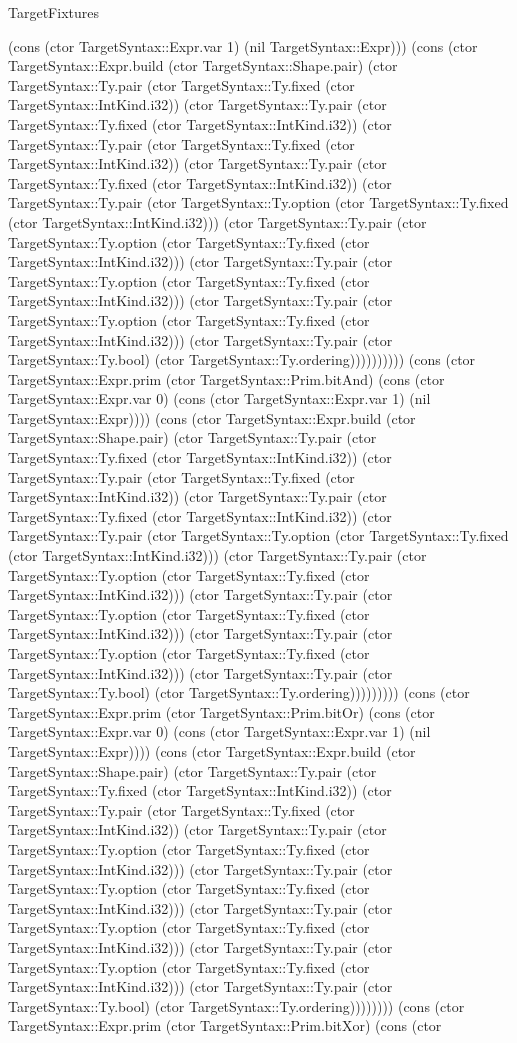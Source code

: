 \begin{lexlean}{TargetFixtures}
\begin{semanticmodule}
{(cons (ctor TargetSyntax::Expr.var 1) (nil TargetSyntax::Expr))) (cons (ctor TargetSyntax::Expr.build (ctor TargetSyntax::Shape.pair) (ctor TargetSyntax::Ty.pair (ctor TargetSyntax::Ty.fixed (ctor TargetSyntax::IntKind.i32)) (ctor TargetSyntax::Ty.pair (ctor TargetSyntax::Ty.fixed (ctor TargetSyntax::IntKind.i32)) (ctor TargetSyntax::Ty.pair (ctor TargetSyntax::Ty.fixed (ctor TargetSyntax::IntKind.i32)) (ctor TargetSyntax::Ty.pair (ctor TargetSyntax::Ty.fixed (ctor TargetSyntax::IntKind.i32)) (ctor TargetSyntax::Ty.pair (ctor TargetSyntax::Ty.option (ctor TargetSyntax::Ty.fixed (ctor TargetSyntax::IntKind.i32))) (ctor TargetSyntax::Ty.pair (ctor TargetSyntax::Ty.option (ctor TargetSyntax::Ty.fixed (ctor TargetSyntax::IntKind.i32))) (ctor TargetSyntax::Ty.pair (ctor TargetSyntax::Ty.option (ctor TargetSyntax::Ty.fixed (ctor TargetSyntax::IntKind.i32))) (ctor TargetSyntax::Ty.pair (ctor TargetSyntax::Ty.option (ctor TargetSyntax::Ty.fixed (ctor TargetSyntax::IntKind.i32))) (ctor TargetSyntax::Ty.pair (ctor TargetSyntax::Ty.bool) (ctor TargetSyntax::Ty.ordering)))))))))) (cons (ctor TargetSyntax::Expr.prim (ctor TargetSyntax::Prim.bitAnd) (cons (ctor TargetSyntax::Expr.var 0) (cons (ctor TargetSyntax::Expr.var 1) (nil TargetSyntax::Expr)))) (cons (ctor TargetSyntax::Expr.build (ctor TargetSyntax::Shape.pair) (ctor TargetSyntax::Ty.pair (ctor TargetSyntax::Ty.fixed (ctor TargetSyntax::IntKind.i32)) (ctor TargetSyntax::Ty.pair (ctor TargetSyntax::Ty.fixed (ctor TargetSyntax::IntKind.i32)) (ctor TargetSyntax::Ty.pair (ctor TargetSyntax::Ty.fixed (ctor TargetSyntax::IntKind.i32)) (ctor TargetSyntax::Ty.pair (ctor TargetSyntax::Ty.option (ctor TargetSyntax::Ty.fixed (ctor TargetSyntax::IntKind.i32))) (ctor TargetSyntax::Ty.pair (ctor TargetSyntax::Ty.option (ctor TargetSyntax::Ty.fixed (ctor TargetSyntax::IntKind.i32))) (ctor TargetSyntax::Ty.pair (ctor TargetSyntax::Ty.option (ctor TargetSyntax::Ty.fixed (ctor TargetSyntax::IntKind.i32))) (ctor TargetSyntax::Ty.pair (ctor TargetSyntax::Ty.option (ctor TargetSyntax::Ty.fixed (ctor TargetSyntax::IntKind.i32))) (ctor TargetSyntax::Ty.pair (ctor TargetSyntax::Ty.bool) (ctor TargetSyntax::Ty.ordering))))))))) (cons (ctor TargetSyntax::Expr.prim (ctor TargetSyntax::Prim.bitOr) (cons (ctor TargetSyntax::Expr.var 0) (cons (ctor TargetSyntax::Expr.var 1) (nil TargetSyntax::Expr)))) (cons (ctor TargetSyntax::Expr.build (ctor TargetSyntax::Shape.pair) (ctor TargetSyntax::Ty.pair (ctor TargetSyntax::Ty.fixed (ctor TargetSyntax::IntKind.i32)) (ctor TargetSyntax::Ty.pair (ctor TargetSyntax::Ty.fixed (ctor TargetSyntax::IntKind.i32)) (ctor TargetSyntax::Ty.pair (ctor TargetSyntax::Ty.option (ctor TargetSyntax::Ty.fixed (ctor TargetSyntax::IntKind.i32))) (ctor TargetSyntax::Ty.pair (ctor TargetSyntax::Ty.option (ctor TargetSyntax::Ty.fixed (ctor TargetSyntax::IntKind.i32))) (ctor TargetSyntax::Ty.pair (ctor TargetSyntax::Ty.option (ctor TargetSyntax::Ty.fixed (ctor TargetSyntax::IntKind.i32))) (ctor TargetSyntax::Ty.pair (ctor TargetSyntax::Ty.option (ctor TargetSyntax::Ty.fixed (ctor TargetSyntax::IntKind.i32))) (ctor TargetSyntax::Ty.pair (ctor TargetSyntax::Ty.bool) (ctor TargetSyntax::Ty.ordering)))))))) (cons (ctor TargetSyntax::Expr.prim (ctor TargetSyntax::Prim.bitXor) (cons (ctor }
\end{semanticmodule}
\end{lexlean}
